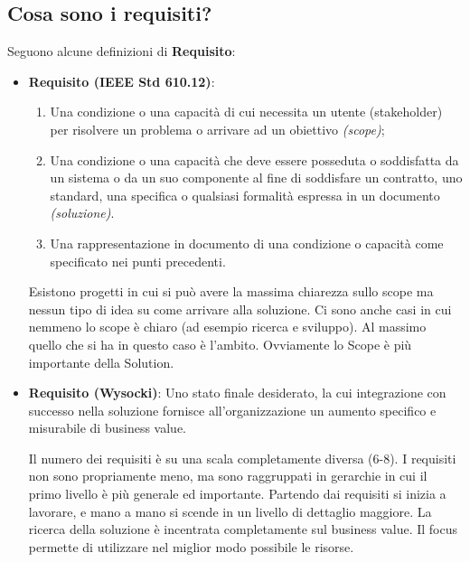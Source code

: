 \subsection{Cosa sono i requisiti?}
Seguono alcune definizioni di \textbf{Requisito}:
\begin{itemize}
	\item \textbf{Requisito (IEEE Std 610.12)}:
	\begin{enumerate}
		\item Una condizione o una capacità di cui necessita un utente (stakeholder) per risolvere un problema o arrivare ad un obiettivo \textit{(scope)};
		\item Una condizione o una capacità che deve essere posseduta o soddisfatta da un sistema o da un suo componente al fine di soddisfare un contratto, uno standard, una specifica o qualsiasi formalità espressa in un documento \textit{(soluzione)}.
		\item Una rappresentazione in documento di una condizione o capacità come specificato nei punti precedenti.
	\end{enumerate}
	\begin{warn}
		Esistono progetti in cui si può avere la massima chiarezza sullo scope ma nessun tipo di idea su come arrivare alla soluzione. Ci sono anche casi in cui nemmeno lo scope è chiaro (ad esempio ricerca e sviluppo). Al massimo quello che si ha in questo caso è l'ambito. Ovviamente lo Scope è più importante della Solution.
	\end{warn}
	\item \textbf{Requisito (Wysocki)}: Uno stato finale desiderato, la cui integrazione con successo nella soluzione fornisce all'organizzazione un aumento specifico e misurabile di business value.
	\begin{info}
		Il numero dei requisiti è su una scala completamente diversa (6-8). I requisiti non sono propriamente meno, ma sono raggruppati in gerarchie in cui il primo livello è più generale ed importante. Partendo dai requisiti si inizia a lavorare, e mano a mano si scende in un livello di dettaglio maggiore. La ricerca della soluzione è incentrata completamente sul business value. Il focus permette di utilizzare nel miglior modo possibile le risorse.
	\end{info}
\end{itemize}
